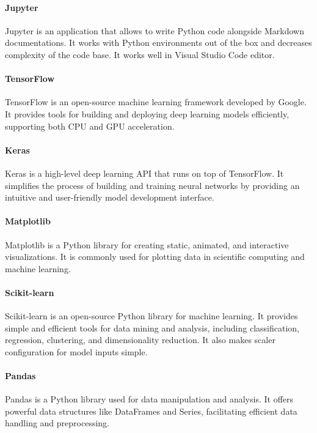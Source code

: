\paragraph{Jupyter} Jupyter is an application that allows to write Python code alongside Markdown documentations. It works with Python environments out of the box and decreases complexity of the code base. It works well in Visual Studio Code editor.

\paragraph{TensorFlow} TensorFlow is an open-source machine learning framework developed by Google. It provides tools for building and deploying deep learning models efficiently, supporting both CPU and GPU acceleration.

\paragraph{Keras} Keras is a high-level deep learning API that runs on top of TensorFlow. It simplifies the process of building and training neural networks by providing an intuitive and user-friendly model development interface.

\paragraph{Matplotlib} Matplotlib is a Python library for creating static, animated, and interactive visualizations. It is commonly used for plotting data in scientific computing and machine learning.

\paragraph{Scikit-learn} Scikit-learn is an open-source Python library for machine learning. It provides simple and efficient tools for data mining and analysis, including classification, regression, clustering, and dimensionality reduction. It also makes scaler configuration for model inputs simple.

\paragraph{Pandas} Pandas is a Python library used for data manipulation and analysis. It offers powerful data structures like DataFrames and Series, facilitating efficient data handling and preprocessing.

